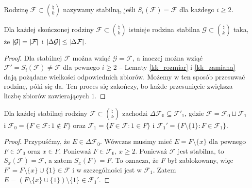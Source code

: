 \begin{definition}
	Rodzinę \(\mathcal F \subset \binom{\natural}{k}\) nazywamy stabilną, jeśli
	\(S_i(\mathcal F) = \mathcal F\) dla każdego \(i\ge 2\).
\end{definition}

\begin{lemma}
	\label{kk_stabilna}
	Dla każdej skończonej rodziny \(\mathcal F\subset \binom{\natural}{k}\) istnieje
	rodzina stabilna \(\mathcal G\subset\binom{\natural}{k}\) taka, że \(\card{\mathcal G}
	= \card{\mathcal F}\) i \(\card{\Delta \mathcal G} \le \card{\Delta \mathcal F}\).
\end{lemma}
\begin{proof}
	Dla stabilnej \(\mathcal F\) można wziąć \(\mathcal G = \mathcal F\), a inaczej
	można wziąć \(\mathcal F' = S_i(\mathcal F) \ne \mathcal F\) dla pewnego \(i\ge
	2\) -- Lematy \ref{kk_rozmiar} i \ref{kk_zamiana} dają pożądane wielkości
	odpowiednich zbiorów. Możemy w ten sposób przesuwać rodzinę, póki się da. Ten
	proces się zakończy, bo każde przesunięcie zwiększa liczbę zbiorów
	zawierających \(1\).
\end{proof}

\begin{lemma}
	\label{kk_zawieranie}
	Dla każdej stabilnej rodziny \(\mathcal F\subset \binom{\natural}{k}\) zachodzi
	\(\Delta\mathcal F_0 \subseteq \mathcal F'_1\), gdzie \(\mathcal F = \mathcal
	F_0 \sqcup \mathcal F_1\) i \(\mathcal F_0 = \{F \in \mathcal F : 1 \notin F\}\)
	oraz \(\mathcal F_1 = \{F \in \mathcal F : 1 \in F\}\) i \(\mathcal F_1' = \{F
	\setminus \{1\} : F \in \mathcal F_1\}\).
\end{lemma}
\begin{proof}
	Przypuśćmy, że \(E \in \Delta\mathcal F_0\). Wówczas musimy mieć \(E = F
	\setminus \{x\}\) dla pewnego \(F \in\mathcal F_0\) oraz \(x \in F\). Ponieważ \(F
	\in\mathcal F_0\), \(x \geq 2\). Ponieważ \(\mathcal F\) jest stabilna, to
	\(S_x(\mathcal F) =\mathcal F\), a zatem \(S_x(F) = F\). To oznacza, że \(F\) był
	zablokowany, więc \(F' = F \setminus \{x\} \cup \{1\} \in \mathcal F\) i w
	szczególności jest w \(\mathcal F_1\). Zatem \(E = (F \setminus \{x\} \cup
	\{1\}) \setminus \{1\} \in \mathcal F_1'\).
\end{proof}

